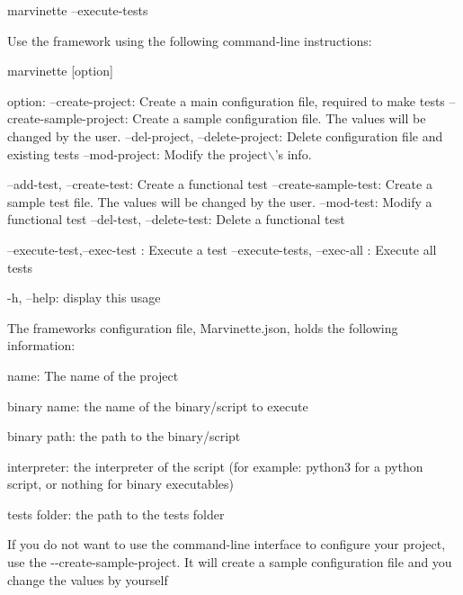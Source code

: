 \begin{DoxyCode}
marvinette --execute-tests
\end{DoxyCode}
 



Use the framework using the following command-\/line instructions\+:


\begin{DoxyCode}
marvinette [option]

  option:
    --create-project: Create a main configuration file, required to make tests
    --create-sample-project: Create a sample configuration file. The values will be changed by the user.
    --del-project, --delete-project: Delete configuration file and existing tests
    --mod-project: Modify the project\(\backslash\)'s info.

    --add-test, --create-test: Create a functional test
    --create-sample-test: Create a sample test file. The values will be changed by the user.
    --mod-test: Modify a functional test
    --del-test, --delete-test: Delete a functional test

    --execute-test,--exec-test : Execute a test
    --execute-tests, --exec-all  : Execute all tests

    -h, --help: display this usage
\end{DoxyCode}
 



The framework\textquotesingle{}s configuration file, {\ttfamily Marvinette.\+json}, holds the following information\+:


\begin{DoxyItemize}
\item {\ttfamily name}\+: The name of the project
\item {\ttfamily binary name}\+: the name of the binary/script to execute
\item {\ttfamily binary path}\+: the path to the binary/script
\item {\ttfamily interpreter}\+: the interpreter of the script (for example\+: python3 for a python script, or nothing for binary executables)
\item {\ttfamily tests folder}\+: the path to the tests\textquotesingle{} folder
\end{DoxyItemize}

If you do not want to use the command-\/line interface to configure your project, use the {\ttfamily -\/-\/create-\/sample-\/project}. It will create a sample configuration file and you change the values by yourself

